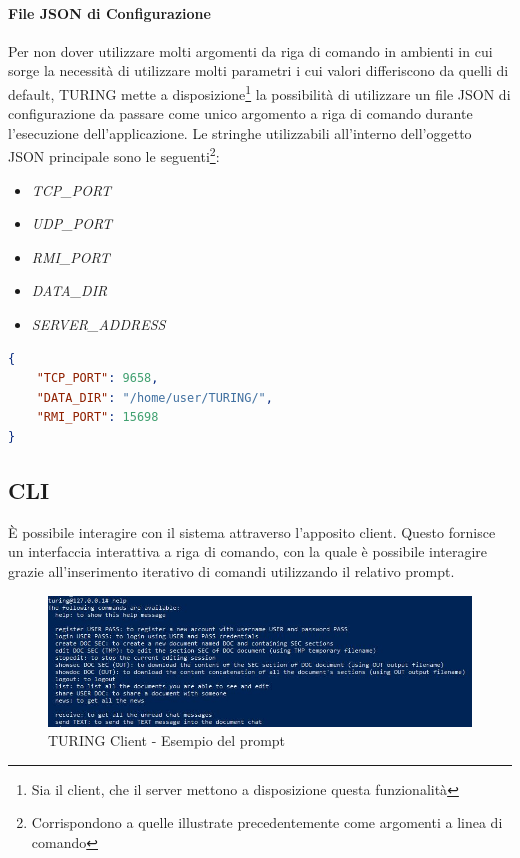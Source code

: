 \paragraph{File JSON di Configurazione}
Per non dover utilizzare molti argomenti da riga di comando in ambienti in cui sorge la necessità di utilizzare molti parametri i cui valori differiscono da quelli di default, TURING mette a disposizione\footnote{Sia il client, che il server mettono a disposizione questa funzionalità} la possibilità di utilizzare un file JSON di configurazione da passare come unico argomento a riga di comando durante l'esecuzione dell'applicazione.
\newline
Le stringhe utilizzabili all'interno dell'oggetto JSON principale sono le seguenti\footnote{Corrispondono a quelle illustrate precedentemente come argomenti a linea di comando}:
\begin{itemize}
	\item \textit{TCP\_PORT}
	\item \textit{UDP\_PORT}
	\item \textit{RMI\_PORT}
	\item \textit{DATA\_DIR}
	\item \textit{SERVER\_ADDRESS}
\end{itemize}

\begin{lstlisting}[caption="JSON File - Esempio", language=JSON]
{
	"TCP_PORT": 9658,
	"DATA_DIR": "/home/user/TURING/",
	"RMI_PORT": 15698
}
\end{lstlisting}

\subsection{CLI}
È possibile interagire con il sistema attraverso l'apposito client. Questo fornisce un interfaccia interattiva a riga di comando, con la quale è possibile interagire grazie all'inserimento iterativo di comandi utilizzando il relativo prompt.

\begin{figure}[h]
	\caption{TURING Client - Esempio del prompt}
	\centering
		\includegraphics[width=0.8\linewidth]{assets/help_message}
\end{figure}
